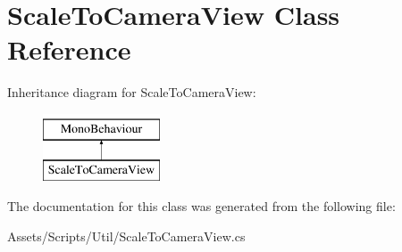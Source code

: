\hypertarget{class_scale_to_camera_view}{}\section{Scale\+To\+Camera\+View Class Reference}
\label{class_scale_to_camera_view}
Inheritance diagram for Scale\+To\+Camera\+View\+:\begin{figure}[H]
\begin{center}
\leavevmode
\includegraphics[height=2.000000cm]{class_scale_to_camera_view}
\end{center}
\end{figure}


The documentation for this class was generated from the following file\+:\begin{DoxyCompactItemize}
\item 
Assets/\+Scripts/\+Util/Scale\+To\+Camera\+View.\+cs\end{DoxyCompactItemize}
